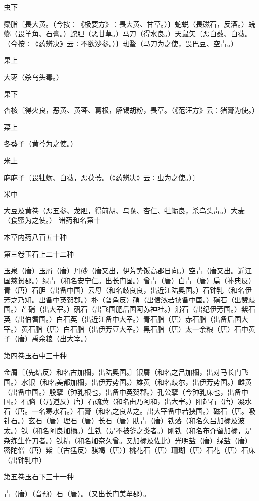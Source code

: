 \documentclass[a4paper,12pt,UTF8,twoside]{ctexbook}
\begin{document}
虫下

麋脂〔畏大黄。（今按∶《极要方》∶畏大黄、甘草。）〕蛇蜕（畏磁石，反酒。）蜣螂（畏羊角、石膏。）蛇胆（恶甘草。）马刀（得水良。）天鼠矢〔恶白蔹、白薇。（今按∶《药辨决》云∶不欲沙参。）〕斑蝥（马刀为之使，畏巴豆、空青。）

果上

大枣（杀乌头毒。）

果下

杏核〔得火良，恶黄、黄芩、葛根，解锡胡粉，畏草。（《范汪方》云∶猪膏为使。）

菜上

冬葵子（黄芩为之使。）

米上

麻麻子〔畏牡蛎、白薇，恶茯苓。（《药辨决》云∶虫为之使。）〕

米中

大豆及黄卷（恶五参、龙胆，得前胡、乌喙、杏仁、牡蛎良，杀乌头毒。）大麦（食蜜为之使。）
诸药和名第十

本草内药八百五十种

第三卷玉石上二十二种

玉泉（唐）玉屑（唐）丹砂（唐又出，伊芳势饭高郡日向。）空青（唐又出。近江国慈贺郡。）绿青（和名安宁仁。出长门国。）曾青（唐）白青（唐）扁（补典反）青（唐）石胆（出备中国）云母（和名歧良良，出近江陆奥国。）石钟乳（和名伊芳之乃知。出备中英贺郡。）朴（普角反）硝（出信浓若挟备中国。）硝石（出赞歧国。）芒硝（出大宰。）矾石（出飞国肥后国阿苏神社。）滑石（出纪伊芳国。）紫石英（出伯耆国。）白石英（出近江备中大宰。）青石脂（唐）赤石脂（出备后国大宰。）黄石脂（唐）白石脂（出伊芳豆大宰。）黑石脂（唐）太一余粮（唐）石中黄子（唐）禹余粮（出大宰。）

第四卷玉石中三十种

金屑〔（先结反）和名古加檷，出陆奥国。〕银屑（和名之吕加檷，出对马长门飞国。）水银（和名美都加檷，出伊芳势国。）雄黄（和名歧尔，出伊芳势国。）雌黄（出备中国。）殷孽（钟乳根也，出备中英贺郡。）孔公孽（今钟乳床也，出备中国。）石脑〔（乃道反）唐〕石硫黄（和名由乃阿和，出大宰。）阳起石（唐）凝水石（唐。一名寒水石。）石膏（和名之良从之。出大宰备中若狭国。）磁石（唐。吸针石。）玄石（唐）理石（唐）长石（唐）肤青（唐）铁落（和名久吕加檷及波太。）铁（和名阿良加檷。）生铁（是不被釜之类者。）刚铁（和名布介留加檷，是杂练生作刀者。）铁精（和名加奈久曾。又加檷及佐比）光明盐（唐）绿盐（唐）密陀僧（唐）紫〔（古猛反）骐竭（唐）〕桃花石（唐）珊瑚（唐）石花（唐）石床（出钟乳中）

第五卷玉石下三十一种

青（唐）（音预）石（唐）。（又出长门美牟郡）。
\end{document}
